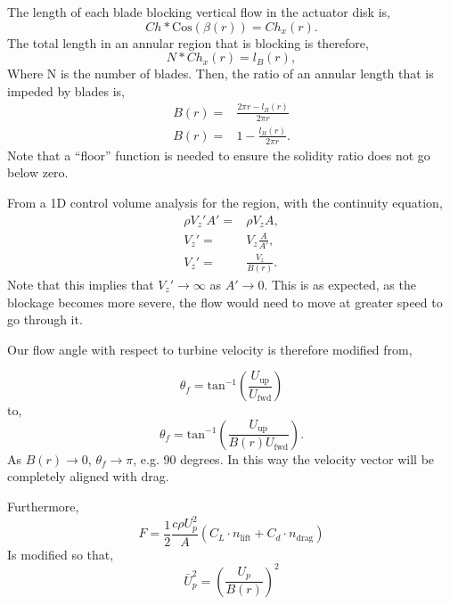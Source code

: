 The length of each blade blocking vertical flow in the actuator disk is, 
\begin{equation}
  Ch * \text{Cos}(\beta(r)) = Ch_x(r). 
\end{equation}
The total length in an annular region that is blocking is therefore,
\begin{equation}
  N * Ch_x(r) = l_B(r),
\end{equation}
Where N is the number of blades. 
Then, the ratio of an annular length that is impeded by blades is, 
\begin{eqnarray}
 B(r) =& \frac{2\pi r- l_B(r)}{2 \pi r}\\
 B(r) =& 1- \frac{l_B(r)}{2 \pi r}. 
\end{eqnarray}
Note that a ``floor'' function is needed to ensure the solidity ratio
does not go below zero. 

From a 1D control volume analysis for the region, with the continuity
equation, 
\begin{eqnarray}
 \rho V_z' A' =& \rho V_z A,\\
 V_z' =& V_z \frac{A}{A'}, \\
 V_z' =& \frac{V_z}{B(r)}.
\end{eqnarray}
Note that this implies that $V_z' \rightarrow \infty$ as $A' \rightarrow
0$. This is as expected, as the blockage becomes more severe, the flow
would need to move at greater speed to go through it. 

Our flow angle with respect to turbine velocity is therefore modified
from,

\begin{equation}
 \theta_f = \text{tan}^{-1}(\frac{U_{\text{up}}}{U_{\text{fwd}}})
\end{equation}
to,
\begin{equation}
 \theta_f = \text{tan}^{-1}(\frac{U_{\text{up}}}{B(r) U_{\text{fwd}}}). 
\end{equation}
As $B(r) \rightarrow 0$, $\theta_f \rightarrow \pi$, e.g. 90 degrees. In
this way the velocity vector will be completely aligned with drag. 

Furthermore, 
\begin{equation}
 F = \frac{1}{2}\frac{c \rho U_p^2}{A}(C_L \cdot n_{\text{lift}} + C_d \cdot n_{\text{drag}})
\end{equation}
Is modified so that, 
\begin{equation}
 \bar U_p^{2} = \left(\frac{U_p}{B(r)}\right)^2
\end{equation}

